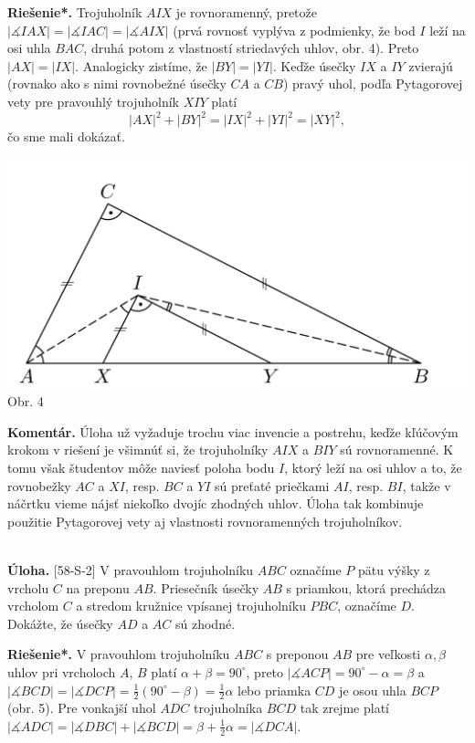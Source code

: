 \documentclass[11pt,a4paper,oneside,final]{book}
\newcommand{\kom}{\textbf{Komentár.} }
\newcommand{\ul}{\textbf{Úloha.} }
\newcommand{\rieh}{\textbf{Riešenie*.} }
\newcommand{\ma}{\measuredangle}
\begin{document}
\rieh Trojuholník $AIX$ je rovnoramenný, pretože $|\ma IAX| = |\ma IAC| = | \ma AIX|$ (prvá rovnosť vyplýva z podmienky, že bod $I$ leží na osi uhla $BAC$, druhá potom z vlastností striedavých uhlov, obr. 4). Preto $|AX| = |IX|$. Analogicky zistíme, že $|BY | = |Y I|$. Keďže úsečky $IX$ a $IY$ zvierajú (rovnako ako s nimi rovnobežné úsečky $CA$ a $CB$) pravý uhol, podľa Pytagorovej vety pre pravouhlý trojuholník $XIY$ platí $$|AX|^2+ |BY |^2= |IX|^2+ |Y I|^2= |XY |^2,$$
čo sme mali dokázať.
\begin{center}
\includegraphics{63S3}\\

Obr. 4
\end{center}
\kom Úloha už vyžaduje trochu viac invencie a postrehu, keďže kľúčovým krokom v riešení je všimnúť si, že trojuholníky $AIX$ a $BIY$ sú rovnoramenné. K tomu však študentov môže naviesť poloha bodu $I$, ktorý leží na osi uhlov a to, že rovnobežky $AC$ a $XI$, resp. $BC$ a $YI$ sú preťaté priečkami $AI$, resp. $BI$, takže v náčrtku vieme nájsť niekoľko dvojíc zhodných uhlov. Úloha tak kombinuje použitie Pytagorovej vety aj vlastnosti rovnoramenných trojuholníkov.\\
\\
\begin{tcolorbox}[breakable,notitle,boxrule=0pt,colback=light-gray,colframe=light-gray]\ul [58-S-2]
 V pravouhlom trojuholníku $ABC$ označíme $P$ pätu výšky z vrcholu $C$ na preponu $AB$. Priesečník úsečky $AB$ s priamkou, ktorá prechádza vrcholom $C$ a stredom kružnice vpísanej trojuholníku $PBC$, označíme $D$. Dokážte, že úsečky $AD$ a $AC$ sú zhodné.

\end{tcolorbox}

\rieh V pravouhlom trojuholníku $ABC$ s preponou $AB$ pre veľkosti $\alpha, \beta$ uhlov pri vrcholoch $A$, $B$ platí $\alpha+\beta= 90^\circ$, preto $|\ma ACP| = 90^\circ -\alpha = \beta$ a $|\ma BCD| = | \ma DCP|= \frac{1}{2}(90^\circ -\beta) = \frac{1}{2}\alpha$ lebo priamka $CD$ je osou uhla $BCP$ (obr. 5). Pre vonkajší uhol $ADC$ trojuholníka $BCD$ tak zrejme platí $|\ma ADC| = |\ma DBC| + |\ma BCD| = \beta  +\frac{1}{2}\alpha = |\ma DCA|.$
\end{document}
